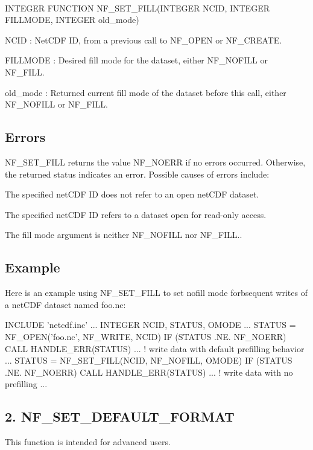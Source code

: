  

I\+N\+T\+E\+G\+ER F\+U\+N\+C\+T\+I\+ON N\+F\+\_\+\+S\+E\+T\+\_\+\+F\+I\+LL(I\+N\+T\+E\+G\+ER N\+C\+ID, I\+N\+T\+E\+G\+ER F\+I\+L\+L\+M\+O\+DE, I\+N\+T\+E\+G\+ER old\+\_\+mode)

{\ttfamily N\+C\+ID} \+: Net\+C\+DF ID, from a previous call to N\+F\+\_\+\+O\+P\+EN or N\+F\+\_\+\+C\+R\+E\+A\+TE.

{\ttfamily F\+I\+L\+L\+M\+O\+DE} \+: Desired fill mode for the dataset, either N\+F\+\_\+\+N\+O\+F\+I\+LL or N\+F\+\_\+\+F\+I\+LL.

{\ttfamily old\+\_\+mode} \+: Returned current fill mode of the dataset before this call, either N\+F\+\_\+\+N\+O\+F\+I\+LL or N\+F\+\_\+\+F\+I\+LL.

\subsection*{Errors }

N\+F\+\_\+\+S\+E\+T\+\_\+\+F\+I\+LL returns the value N\+F\+\_\+\+N\+O\+E\+RR if no errors occurred. Otherwise, the returned status indicates an error. Possible causes of errors include\+:


\begin{DoxyItemize}
\item The specified net\+C\+DF ID does not refer to an open net\+C\+DF dataset.
\item The specified net\+C\+DF ID refers to a dataset open for read-\/only access.
\item The fill mode argument is neither N\+F\+\_\+\+N\+O\+F\+I\+LL nor N\+F\+\_\+\+F\+I\+LL..
\end{DoxyItemize}

\subsection*{Example }

Here is an example using N\+F\+\_\+\+S\+E\+T\+\_\+\+F\+I\+LL to set nofill mode forbsequent writes of a net\+C\+DF dataset named foo.\+nc\+:


\begin{DoxyCode}
INCLUDE 'netcdf.inc'
   ...
INTEGER NCID, STATUS, OMODE
   ...
STATUS = NF\_OPEN('foo.nc', NF\_WRITE, NCID)
IF (STATUS .NE. NF\_NOERR) CALL HANDLE\_ERR(STATUS)
   ...
! write data with default prefilling behavior
   ...
STATUS = NF\_SET\_FILL(NCID, NF\_NOFILL, OMODE)
IF (STATUS .NE. NF\_NOERR) CALL HANDLE\_ERR(STATUS)
   ...
! write data with no prefilling
   ...
\end{DoxyCode}
\hypertarget{nc_f77_interface_guide_f77_NF-SET-DEFAULT-FORMAT}{}\subsection{2. N\+F\+\_\+\+S\+E\+T\+\_\+\+D\+E\+F\+A\+U\+L\+T\+\_\+\+F\+O\+R\+M\+A\+T }\label{nc_f77_interface_guide_f77_NF-SET-DEFAULT-FORMAT}
This function is intended for advanced users.

